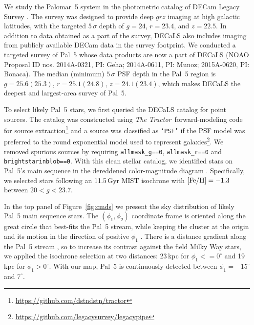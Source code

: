 \documentclass[twocolumn]{aastex62}
\newcommand{\tractor}{\textsl{The Tractor}}
\newcommand{\sa}[1]{{\color{magenta} SP: #1}}
\begin{document}
We study the Palomar~5 system in the photometric catalog of DECam Legacy Survey \citep[DECaLS, part of the DESI Legacy Imaging Surveys,][]{dey2019}.
The survey was designed to provide deep $grz$ imaging at high galactic latitudes, with the targeted $5\,\sigma$ depth of $g=24$, $r=23.4$, and $z=22.5$.
In addition to data obtained as a part of the survey, DECaLS also includes imaging from publicly available DECam data in the survey footprint.
We conducted a targeted survey of Pal~5 whose data products are now a part of DECaLS (NOAO Proposal ID nos. 2014A-0321, PI: Geha; 2014A-0611, PI: Munoz; 2015A-0620, PI: Bonaca).
The median (minimum) $5\,\sigma$ PSF depth in the Pal~5 region is $g=25.6(25.3)$, $r=25.1(24.8)$, $z=24.1(23.4)$, which makes DECaLS the deepest and largest-area survey of Pal~5.

To select likely Pal~5 stars, we first queried the DECaLS catalog for point sources.
The catalog was constructed using \tractor\ forward-modeling code for source extraction\footnote{\url{https://github.com/dstndstn/tractor}} and a source was classified as \texttt{`PSF'} if the PSF model was preferred to the round exponential model used to represent galaxies\footnote{\url{https://github.com/legacysurvey/legacypipe}}.
We removed spurious sources by requiring \texttt{allmask\_g==0}, \texttt{allmask\_r==0} and \texttt{brightstarinblob==0}.
With this clean stellar catalog, we identified stars on Pal~5's main sequence in the dereddened color-magnitude diagram \citep{Schlegel:1998}.
Specifically, we selected stars following an 11.5\,Gyr MIST isochrone with $\rm [Fe/H] = -1.3$ \citep{Choi:2016} between $20<g<23.7$.

In the top panel of Figure~\ref{fig:cmds} we present the sky distribution of likely Pal~5 main sequence stars.
The $(\phi_1,\phi_2)$ coordinate frame is oriented along the great circle that best-fits the Pal~5 stream, while keeping the cluster at the origin and its motion in the direction of positive $\phi_1$ \citep{gala}.
There is a distance gradient along the Pal~5 stream \citep{Ibata:2016}, so to increase its contrast against the field Milky Way stars, we applied the isochrone selection at two distances: 23\,kpc for $\phi_1<=0^\circ$ and 19\,kpc for $\phi_1>0^\circ$.
With our map, Pal~5 is continuously detected between $\phi_1=-15^\circ$ and $7^\circ$.
\end{document}
